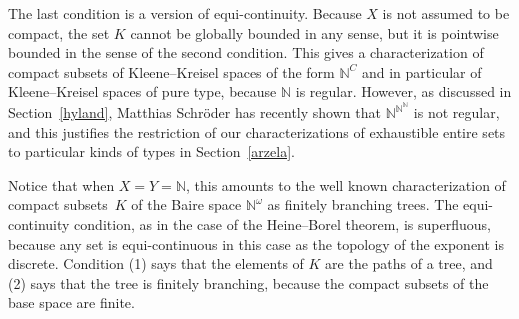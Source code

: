 \documentclass{LMCS}
\newcommand{\N}{\mathbb{N}}
\begin{document}
The last condition is a version of equi-continuity.  Because $X$ is
not assumed to be compact, the set $K$ cannot be globally bounded in
any sense, but it is pointwise bounded in the sense of the second
condition.  This gives a characterization of compact subsets of
Kleene--Kreisel spaces of the form $\N^C$ and in particular of
Kleene--Kreisel spaces of pure type, because $\N$ is regular. However,
as discussed in Section~\ref{hyland}, Matthias Schr\"oder has recently
shown that $\N^{\N^\N}$ is not regular, and this justifies the
restriction of our characterizations of exhaustible entire sets to
particular kinds of types in Section~\ref{arzela}.

Notice that when $X=Y=\N$, this amounts to the well known
characterization of compact subsets~$K$ of the Baire space $\N^\omega$
as finitely branching trees. The equi-continuity condition, as in the
case of the Heine--Borel theorem, is superfluous, because any set is
equi-continuous in this case as the topology of the exponent is
discrete. Condition (1) says that the elements of $K$ are the paths of
a tree, and (2) says that the tree is finitely branching, because the
compact subsets of the base space are finite.

\medskip
\end{document}
